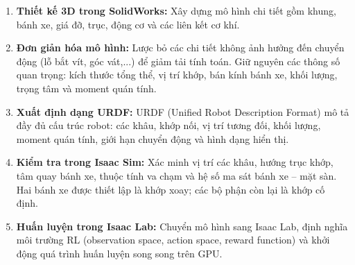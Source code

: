 \begin{enumerate}
    \item \textbf{Thiết kế 3D trong SolidWorks:} Xây dựng mô hình chi tiết gồm
    khung, bánh xe, giá đỡ, trục, động cơ và các liên kết cơ khí.

    \item \textbf{Đơn giản hóa mô hình:} Lược bỏ các chi tiết không ảnh hưởng
    đến chuyển động (lỗ bắt vít, góc vát,...) để giảm tải tính toán. Giữ nguyên
    các thông số quan trọng: kích thước tổng thể, vị trí khớp, bán kính bánh xe,
    khối lượng, trọng tâm và moment quán tính.

    \item \textbf{Xuất định dạng URDF:} URDF (Unified Robot Description Format)
    mô tả đầy đủ cấu trúc robot: các khâu, khớp nối, vị trí tương đối, khối
    lượng, moment quán tính, giới hạn chuyển động và hình dạng hiển thị.

    \item \textbf{Kiểm tra trong Isaac Sim:} Xác minh vị trí các khâu, hướng
    trục khớp, tâm quay bánh xe, thuộc tính va chạm và hệ số ma sát bánh xe --
    mặt sàn. Hai bánh xe được thiết lập là khớp xoay; các bộ phận còn lại là
    khớp cố định.

    \item \textbf{Huấn luyện trong Isaac Lab:} Chuyển mô hình sang Isaac Lab,
    định nghĩa môi trường RL (observation space, action space, reward function)
    và khởi động quá trình huấn luyện song song trên GPU.
\end{enumerate}
